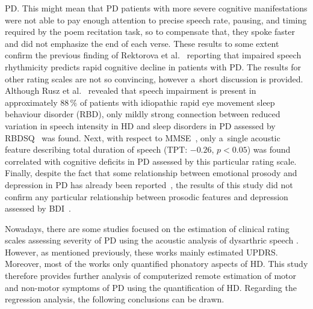 PD. This might mean that PD patients with more severe cognitive manifestations were not able to pay enough attention to precise speech rate, pausing, and timing required by the poem recitation task, so to compensate that, they spoke faster and did not emphasize the end of each verse. These results to some extent confirm the previous finding of Rektorova et al.~\cite{Rektorova2016} reporting that impaired speech rhythmicity predicts rapid cognitive decline in patients with PD. The results for other rating scales are not so convincing, however a~short discussion is provided. Although Rusz et al.~\cite{Rusz2016} revealed that speech impairment is present in approximately $88\,\%$ of patients with idiopathic rapid eye movement sleep behaviour disorder (RBD), only mildly strong connection between reduced variation in speech intensity in HD and sleep disorders in PD assessed by RBDSQ~\cite{Stiasny2007} was found. Next, with respect to MMSE~\cite{Folstein1975}, only a~single acoustic feature describing total duration of speech (TPT: $-0.26$, $p<0.05$) was found correlated with cognitive deficits in PD assessed by this particular rating scale. Finally, despite the fact that some relationship between emotional prosody and depression in PD has already been reported~\cite{Velez2008}, the results of this study did not confirm any particular relationship between prosodic features and depression assessed by BDI~\cite{Beck2000}.

Nowadays, there are some studies focused on the estimation of clinical rating scales assessing severity of PD using the acoustic analysis of dysarthric speech \cite{Asgari2010, Bayestehtashk2015, Eskidere2012, Peterek2013, Tsanas2010, Tsanas2010a, Tsanas2010b, Smekal2015c, Rektorova2016}. However, as mentioned previously, these works mainly estimated UPDRS. Moreover, most of the works only quantified phonatory aspects of HD. This study therefore provides further analysis of computerized remote estimation of motor and non-motor symptoms of PD using the quantification of HD. Regarding the regression analysis, the following conclusions can be drawn.

